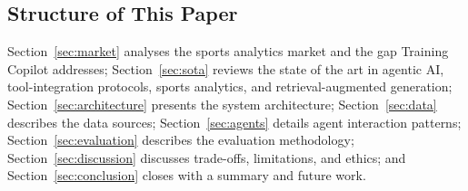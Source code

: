 \subsection{Structure of This Paper}\label{sec:intro:structure}

Section~\ref{sec:market} analyses the sports analytics market and the gap Training Copilot addresses; Section~\ref{sec:sota} reviews the state of the art in agentic AI, tool-integration protocols, sports analytics, and retrieval-augmented generation; Section~\ref{sec:architecture} presents the system architecture; Section~\ref{sec:data} describes the data sources; Section~\ref{sec:agents} details agent interaction patterns; Section~\ref{sec:evaluation} describes the evaluation methodology; Section~\ref{sec:discussion} discusses trade-offs, limitations, and ethics; and Section~\ref{sec:conclusion} closes with a summary and future work.
